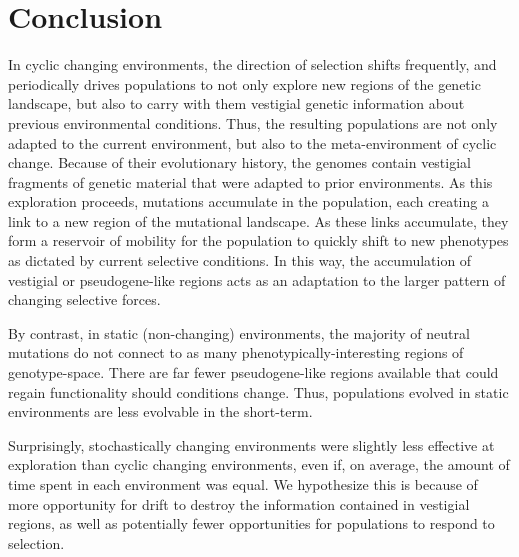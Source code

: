 \documentclass[10pt,letterpaper]{article}
\begin{document}
\section*{Conclusion}
In cyclic changing environments, the direction of selection shifts frequently, and periodically drives populations to not only explore new regions of the genetic landscape, but also to carry with them vestigial genetic information about previous environmental conditions. Thus, the resulting populations are not only adapted to the current environment, but also to the meta-environment of cyclic change. Because of their evolutionary history, the genomes contain vestigial fragments of genetic material that were adapted to prior environments. As this exploration proceeds, mutations accumulate in the population, each creating a link to a new region of the mutational landscape. As these links accumulate, they form a reservoir of mobility for the population to quickly shift to new phenotypes as dictated by current selective conditions. In this way, the accumulation of vestigial or pseudogene-like regions acts as an adaptation to the larger pattern of changing selective forces.

By contrast, in static (non-changing) environments, the majority of neutral mutations do not connect to as many phenotypically-interesting regions of genotype-space. There are far fewer pseudogene-like regions available that could regain functionality should conditions change. Thus, populations evolved in static environments are less evolvable in the short-term.

Surprisingly, stochastically changing environments were slightly less effective at exploration
than cyclic changing environments, even if, on average, the amount of time spent in each environment was equal. We hypothesize this is because of more opportunity for drift to destroy the information contained in vestigial regions, as well as potentially fewer opportunities for populations to respond to selection.
\end{document}
